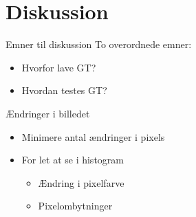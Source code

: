 \section{Diskussion} 
\begin{frame}{Emner til diskussion}
    To overordnede emner:
    \begin{itemize}
        \item Hvorfor lave GT?
        \item Hvordan testes GT?
    \end{itemize}
\end{frame}

\begin{frame}{Ændringer i billedet}

    \begin{itemize}
        \setlength\itemsep{1em}
        \item Minimere antal ændringer i pixels
        \item For let at se i histogram
        \begin{itemize}
            \vspace*{1em}
            \setlength\itemsep{1em}
            \item<con@1->[$\times$] Ændring i pixelfarve
            \item<pro@1->[\checkmark] Pixelombytninger
        \end{itemize}
    \end{itemize}
\end{frame}

